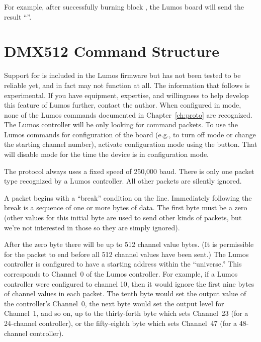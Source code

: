 \documentclass[letterpaper,twoside,onecolumn,openright,final]{memoir}
\begin{document}
For example, after successfully burning block , the Lumos board
will send the result ``''.


\chapter{DMX512 Command Structure}\label{ch:dmx}
\begin{NotImplemented*}{Support for  is included in the Lumos firmware but has not
been tested to be reliable yet, and in fact may not function at all.  The information that follows
is experimental.  If you have  equipment, expertise, and willingness to help develop
this feature of Lumos further, contact the author.}
When configured in  mode, none of the Lumos commands documented in Chapter~\ref{ch:proto}
are recognized. The Lumos controller will be only looking for  command packets.
To use the Lumos commands for configuration of the board (e.g., to turn off  mode or change
the starting channel number), activate configuration mode using the  button.  That will disable  mode for the time the device is in configuration mode.

The  protocol always uses a fixed speed of 250,000 baud.  There is only one packet type 
recognized by a Lumos controller.  All other packets are silently ignored.

A packet begins with a ``break'' condition on the line.  Immediately following the break is a sequence
of one or more bytes of data.  The first byte must be a zero (other values for this initial byte are used
to send other kinds of  packets, but we're not interested in those so they are simply
ignored).

After the zero byte there will be up to 512 channel value bytes.  (It is permissible for the packet to end
before all 512 channel values have been sent.)  The Lumos controller is configured to have a starting address
within the  ``universe.'' This corresponds to Channel~0 of the Lumos controller.  For example,
if a Lumos controller were configured to  channel 10, then it would ignore the first nine
bytes of channel values in each packet.  The tenth byte would set the output value of the controller's Channel~0, the next byte would set the output level for Channel~1, and so on, up to the thirty-forth byte
which sets Channel~23 (for a 24-channel controller), or the fifty-eighth byte which sets Channel~47 (for
a 48-channel controller).


\end{NotImplemented*}
\end{document}
